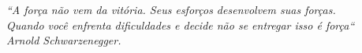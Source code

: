 \begin{epigrafe}
    \vspace*{\fill}
	\begin{flushright}
	\textit{``A força não vem da vitória. Seus esforços desenvolvem
		suas  forças. \\Quando você enfrenta dificuldades e decide não se entregar 
		isso é força`` \\
		Arnold Schwarzenegger.}
	\end{flushright}
\end{epigrafe}
